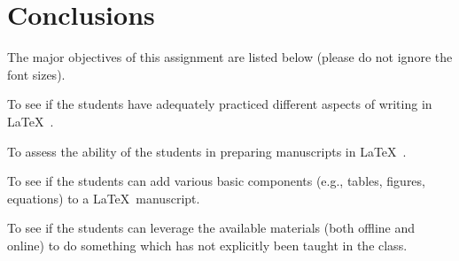 \documentclass[12pt,a4paper]{article}
\begin{document}
	\section{Conclusions}
	The major objectives of this assignment are listed below (please do not ignore the font
	sizes).
	\begin{itemize}
		\item{ \Large To see if the students have adequately practiced different aspects of writing in \LaTeX\ .} 
		{\large \item  To assess the ability of the students in preparing manuscripts in \LaTeX\ .}
		\item To see if the students can add various basic components (e.g., tables, figures, equations) to a \LaTeX\ manuscript.
		{\small \item To see if the students can leverage the available materials (both offline and online) to do something which has not explicitly been taught in the class.}
		
	\end{itemize}


	
\end{document}
